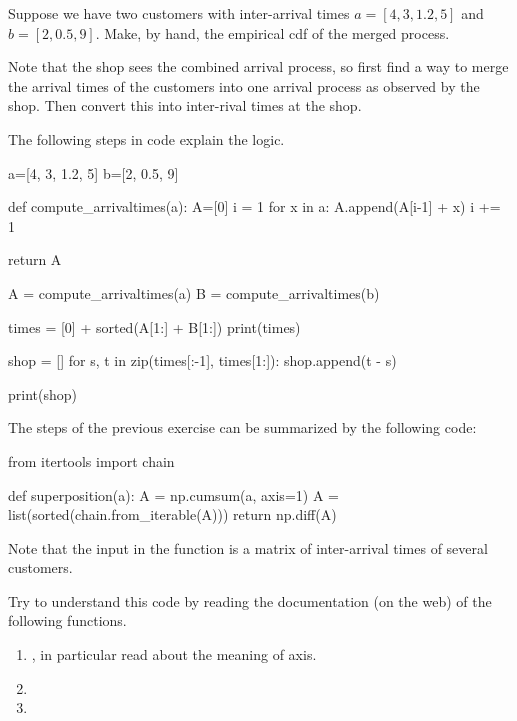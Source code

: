 \begin{exercise}


  Suppose we have two customers with inter-arrival times $a=[4, 3, 1.2, 5]$ and $b=[2, 0.5, 9]$. Make, by hand, the empirical cdf of the merged process.

  \begin{hint}
Note that the shop sees the combined arrival process, so first find a way to merge the arrival times of the customers into one arrival process as observed by the shop. Then convert this into inter-rival times at the shop.
  \end{hint}
  \begin{solution}
    The following steps in code explain the logic.
    \begin{pyverbatim}
a=[4, 3, 1.2, 5]
b=[2, 0.5, 9]

def compute_arrivaltimes(a):
    A=[0]
    i = 1
    for x in a:
        A.append(A[i-1] + x)
        i += 1

    return A

A = compute_arrivaltimes(a)
B = compute_arrivaltimes(b)


times = [0] + sorted(A[1:] + B[1:]) 
print(times)

shop = []
for s, t in zip(times[:-1], times[1:]):
    shop.append(t - s)

print(shop)
    \end{pyverbatim}
  \end{solution}
\end{exercise}


\begin{exercise}
The steps of the previous exercise can be summarized by the following code:
\begin{pyverbatim}
from itertools import chain

def superposition(a):
    A = np.cumsum(a, axis=1)
    A = list(sorted(chain.from_iterable(A)))
    return np.diff(A)
\end{pyverbatim}  
Note that the input  in the function  is a matrix of inter-arrival times of several customers.

Try to understand this code by reading the documentation (on the web) of the following functions.
\begin{enumerate}
\item {}, in particular read about the meaning of axis.
\item {}
\item {}
\end{enumerate}
\end{exercise}


